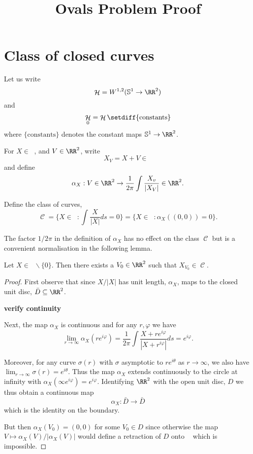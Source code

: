 \documentclass[12pt]{article}
\date{}
\title{Ovals Problem Proof}
\DeclareMathOperator{\HS}{\mathcal{H}}
\DeclareMathOperator{\HSnc}{\HS_0}
\DeclareMathOperator{\C}{\mathcal{C}}
\DeclareMathOperator{\So}{\mathbb{S}^1}
\begin{document}
\maketitle

\section{Class of closed curves}
\label{sec-1}

Let us write
\[
\HS = W^{1,2}(\So \to \RR^2)
\]
and
\[
\HSnc = \HS \setdiff \lbrace \text{constants} \rbrace
\]
where \(\lbrace \text{constants} \rbrace\) denotes the constant maps \(\So \to \RR^2\).

For \(X \in \HSnc\), and \(V \in \RR^2\), write
\[
X_V = X + V \in \HSnc
\]
and define
\[
\alpha_X : V \in \RR^2 \to \frac{1}{2\pi} \int \frac{X_v}{|X_V|} \in \RR^2.
\]

Define the class of curves,
\[
\C = \lbrace X \in \HSnc : \int_{\So} \frac{X}{|X|} ds = 0 \rbrace = \lbrace X \in \HSnc : \alpha_X((0, 0)) = 0 \rbrace.
\]

The factor \(1/2\pi\) in the definition of \(\alpha_X\) has no effect on the class \(\C\) but is a convenient normalisation in the following lemma.

\begin{lemma}
\label{lem:translate_C}
Let \(X \in \HSnc \backslash \lbrace 0 \rbrace\). Then there exists a \(V_0 \in \RR^2\) such that \(X_{V_0} \in \C\).
\end{lemma}

\begin{proof}
First observe that since \(X/|X|\) has unit length, \(\alpha_X\), maps to the closed unit disc, \(\bar{D} \subseteq \RR^2\).

\textbf{verify continuity}

Next, the map \(\alpha_X\) is continuous and for any \(r, \varphi\) we have
\[
\lim_{r \to \infty} \alpha_X (r e^{i\varphi}) = \frac{1}{2\pi} \int \frac{X + re^{i\varphi}}{|X + r^{i\varphi}|} ds = e^{i\varphi}.
\]

Moreover, for any curve \(\sigma(r)\) with \(\sigma\) asymptotic to \(r e^{i\theta}\) as \(r \to \infty\), we also have \(\lim_{r\to\infty} \sigma(r) = e^{i\theta}\). Thus the map \(\alpha_X\) extends continuously to the circle at infinity with \(\alpha_X(\infty e^{i\varphi}) = e^{i\varphi}\). Identifying \(\RR^2\) with the open unit disc, \(D\) we thus obtain a continuous map
\[
\alpha_X : \bar{D} \to \bar{D}
\]
which is the identity on the boundary.

But then \(\alpha_X(V_0) = (0, 0)\) for some \(V_0 \in D\) since otherwise the map \(V \mapsto \alpha_X(V)/|\alpha_X(V)|\) would define a retraction of \(D\) onto \(\So\) which is impossible.
\end{proof}
\end{document}
